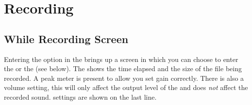 \section{\label{ref:Recording}Recording}
\subsection{\label{ref:while_recording_screen}While Recording Screen}

Entering the  option in the  brings up
a screen in which you can choose to enter the  or
the  (see below). The 
shows the time elapsed and the size of the file being recorded. A peak meter
is present to allow you set gain correctly. There is also a volume setting,
this will only affect the output level of the \dap{} and does \emph{not}
affect the recorded sound.
 settings are shown on the last line.

